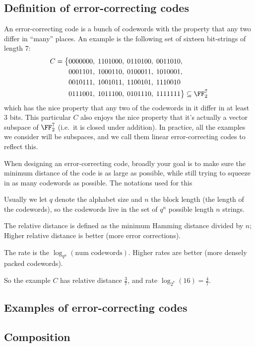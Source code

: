 \documentclass[11pt]{scrreprt}
\begin{document}
\subsection{Definition of error-correcting codes}
An \alert{error-correcting code} is a bunch of codewords
with the property that any two differ in ``many'' places.
An example is the following set of sixteen bit-strings of length $7$:
\begin{align*}
  C = \big\{
    & 0000000, \; 1101000, \; 0110100, \; 0011010, \\
    & 0001101, \; 1000110, \; 0100011, \; 1010001, \\
    & 0010111, \; 1001011, \; 1100101, \; 1110010 \\
    & 0111001, \; 1011100, \; 0101110, \; 1111111 \big\} \subseteq \FF_2^7
\end{align*}
which has the nice property that any two of the codewords in it differ in at least $3$ bits.
This particular $C$ also enjoys the nice property that it's actually
a vector subspace of $\FF_2^7$ (i.e.\ it is closed under addition).
In practice, all the examples we consider will be subspaces,
and we call them \alert{linear error-correcting codes} to reflect this.

When designing an error-correcting code, broadly your goal is to make sure the
minimum distance of the code is as large as possible,
while still trying to squeeze in as many codewords as possible.
The notations used for this
\begin{itemize}
  \ii Usually we let $q$ denote the alphabet size and $n$ the block length
  (the length of the codewords),
  so the codewords live in the set of $q^n$ possible length $n$ strings.

  \ii The \alert{relative distance} is defined as the minimum Hamming distance divided by $n$;
  Higher relative distance is better (more error corrections).

  \ii The \alert{rate} is the $\log_{q^n}(\text{num codewords})$.
  Higher rates are better (more densely packed codewords).
\end{itemize}
So the example $C$ has relative distance $\frac 37$,
and rate $\log_{2^7}(16) = \frac 47$.

\subsection{Examples of error-correcting codes}

\subsection{Composition}
\end{document}

